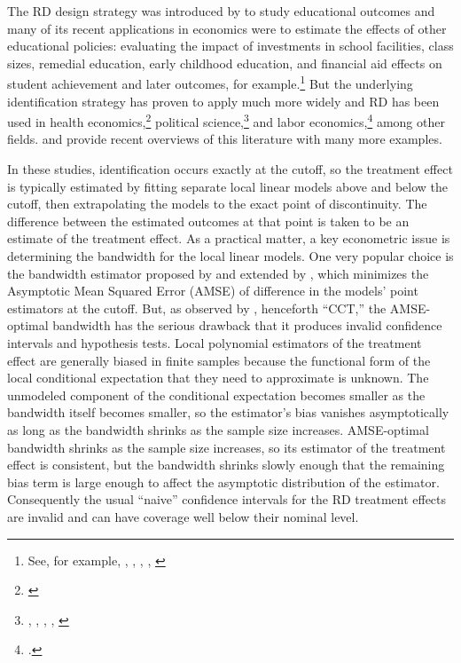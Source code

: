 \documentclass[12pt,fleqn]{article}
\begin{document}
The RD design strategy was introduced by \cite{thistlethwaite1960} to study
educational outcomes and many of its recent applications in economics were to
estimate the effects of other educational policies: evaluating the impact of
investments in school facilities, class sizes, remedial education, early
childhood education, and financial aid effects on student achievement and
later outcomes, for example.\footnote{%
  See, for example, \cite{vdk2002}, \cite{jacoblefgren2004},
  \cite{ludwig2007}, \cite{urquiola2009}, \cite{cellini2010}} %
But the underlying identification strategy has proven to apply much more
widely and RD has been used in health economics,\footnote{%
  \cite{Card2009,barreca2011saving}} %
political science,\footnote{%
  \cite{lee2008}, \cite{caughey2011elections}, \cite{keele2014geographic},
  \cite{erikson2015}, \cite{Fujiwara2011,Fujiwara2015}} %
and labor economics,\footnote{%
  \cite{schmieder2012}.} %
among other fields. \cite{imbens2008} and \cite{lee2010} provide recent
overviews of this literature with many more examples.

In these studies, identification occurs exactly at the cutoff, so the
treatment effect is typically estimated by fitting separate local linear
models above and below the cutoff, then extrapolating the models to the exact
point of discontinuity. The difference between the estimated outcomes at that
point is taken to be an estimate of the treatment effect. As a practical
matter, a key econometric issue is determining the bandwidth for the local
linear models.  One very popular choice is the bandwidth estimator proposed by
\cite{IK} and extended by \cite{calonico2014}, which minimizes the Asymptotic
Mean Squared Error (AMSE) of difference in the models' point estimators at the
cutoff.  But, as observed by \cite{calonico2014}, henceforth ``CCT,''
the AMSE-optimal bandwidth has the serious drawback that it produces invalid
confidence intervals and hypothesis tests. Local polynomial estimators of the
treatment effect are generally biased in finite samples because the functional
form of the local conditional expectation that they need to approximate is unknown.
The unmodeled component of the conditional expectation becomes smaller as the
bandwidth itself becomes smaller, so the estimator's bias vanishes
asymptotically as long as the bandwidth shrinks as the sample size increases.
AMSE-optimal bandwidth shrinks as the sample size increases, so its estimator
of the treatment effect is consistent, but the bandwidth shrinks slowly enough
that the remaining bias term is large enough to affect the asymptotic
distribution of the estimator. Consequently the usual ``naive'' confidence
intervals for the RD treatment effects are invalid and can have coverage well
below their nominal level.
\end{document}
